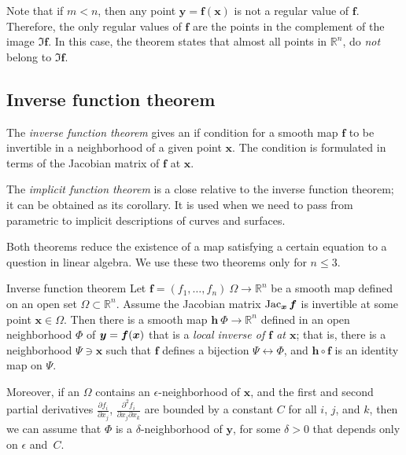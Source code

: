 Note that if $m<n$, then any point $\bm{y}=\bm{f}(\bm{x})$ is not a regular value of $\bm{f}$.
Therefore, the only regular values of $\bm{f}$ are the points in the complement of the image $\Im \bm{f}$.
In this case, the theorem states that almost all points in $\mathbb{R}^n$, do {}\emph{not} belong to $\Im \bm{f}$.


\subsection*{Inverse function theorem}

The \emph{inverse function theorem} gives an if condition for a smooth map $\bm{f}$ to be invertible in a neighborhood of a given point $\bm{x}$.
The condition is formulated in terms of the Jacobian matrix of $\bm{f}$ at $\bm{x}$.

The \emph{implicit function theorem} is a close relative to the inverse function theorem;
it can be obtained as its corollary.
It is used when we need to pass from parametric to implicit descriptions of curves and surfaces.

Both theorems reduce the existence of a map satisfying a certain equation to a question in linear algebra.
We use these two theorems only for $n\le 3$.

\begin{thm}{Inverse function theorem}\label{thm:inverse}
Let $\bm{f}=(f_1,\dots,f_n)\:\Omega\to\mathbb{R}^n$ be a smooth map
defined on an open set $\Omega\subset \mathbb{R}^n$.
Assume the Jacobian matrix
$\mathop{\rm Jac}\nolimits_{\bm{x}}\bm{f}$
is invertible at some point $\bm{x}\in \Omega$.
Then there is a smooth map $\bm{h}\:\Phi\to\mathbb{R}^n$ defined in an open neighborhood $\Phi$ of ${\bm{y}}\z=\bm{f}(\bm{x})$ that is a {}\emph{local inverse of $\bm{f}$ at $\bm{x}$};
that is, there is a neighborhood $\Psi\ni \bm{x}$ such that
$\bm{f}$ defines a bijection $\Psi\leftrightarrow \Phi$, and
$\bm{h} \circ \bm{f}$ is an identity map on $\Psi$.

Moreover, if an $\Omega$ contains an $\epsilon$-neighborhood of $\bm{x}$, and the first and second partial derivatives $\tfrac{\partial f_i}{\partial x_j}$, $\tfrac{\partial^2 f_i}{\partial x_j\partial x_k}$ are bounded by a constant $C$ for all $i$, $j$, and $k$, then we can assume that $\Phi$ is a $\delta$-neighborhood of $\bm{y}$, for some $\delta>0$ that depends only on $\epsilon$ and~$C$. 
\end{thm}

